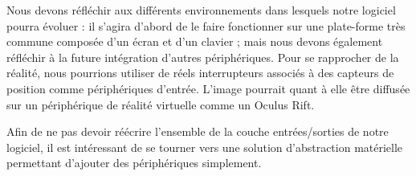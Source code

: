 Nous devons réfléchir aux différents environnements dans lesquels notre logiciel pourra évoluer : il s'agira d'abord de le faire fonctionner sur une plate-forme très commune composée d'un écran et d'un clavier ; mais nous devons également réfléchir à la future intégration d'autres périphériques. Pour se rapprocher de la réalité, nous pourrions utiliser de réels interrupteurs associés à des capteurs de position comme périphériques d'entrée. L'image pourrait quant à elle être diffusée sur un périphérique de réalité virtuelle comme un Oculus Rift.

Afin de ne pas devoir réécrire l'ensemble de la couche entrées/sorties de notre logiciel, il est intéressant de se tourner vers une solution d'abstraction matérielle permettant d'ajouter des périphériques simplement.
